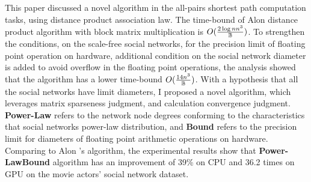 \documentclass[review]{cvpr}
\begin{document}
This paper discussed a novel algorithm in the all-pairs shortest path computation tasks, using distance product association law.
The time-bound of Alon \etal distance product algorithm with block matrix multiplication is \(O({2\log{n}n^3\over \Bbb B})\).
To strengthen the conditions, on the scale-free social networks, for the precision limit of floating point operation on hardware,
additional condition on the social network diameter is added to avoid overflow in the floating point operations,
the analysis showed that the algorithm has a lower time-bound \(O({14n^3\over \Bbb B})\).
With a hypothesis that all the social networks have limit diameters, I proposed a novel algorithm,
which leverages matrix sparseness judgment, and calculation convergence judgment.
\textbf{Power-Law} refers to the network node degrees conforming to the characteristics that social networks power-law distribution,
and \textbf{Bound} refers to the precision limit for diameters of floating point arithmetic operations on hardware.
Comparing to Alon \etal's algorithm, the experimental results show that \textbf{Power-LawBound} algorithm has an improvement of 39\% on CPU and 36.2 times on GPU on the movie actors' social network dataset.
\end{document}
